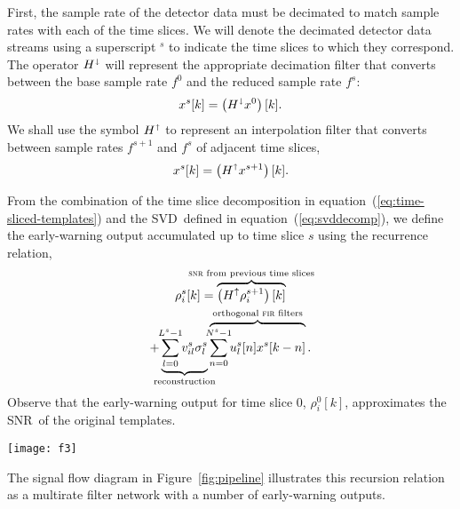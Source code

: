 \documentclass[preprint2]{aastex}
\newcommand{\SNR}{SNR}%
\newcommand{\SVD}{SVD}%
\newcommand{\fir}{FIR}%
\newcommand{\lloid}{LLOID}%
\def\clap#1{\hbox to 0pt{\hss#1\hss}}
\def\mathclap{\mathpalette\mathclapinternal}
\def\mathclapinternal#1#2{\clap{$\mathsurround=0pt#1{#2}$}}
\begin{document}
First, the sample rate of the detector data must be decimated to match sample
rates with each of the time slices.  We will denote the decimated detector data
streams using a superscript $^s$ to indicate the time slices to which they
correspond.  The operator $H^\shortdownarrow$ will represent the appropriate
decimation filter that converts between the base sample rate $f^0$ and the
reduced sample rate $f^s$:
\begin{equation*}
\label{eq:decomp}
	x^{s}[k] = \left( H^\shortdownarrow x^0\right)[k].
\end{equation*}
We shall use the symbol $H^\shortuparrow$ to represent an interpolation filter
that converts between sample rates $f^{s+1}$ and $f^s$ of adjacent time slices,
\begin{equation*}
	x^{s}[k] = \left( H^\shortuparrow x^{s+1}\right)[k].
\end{equation*}

From the combination of the time slice decomposition in
equation~(\ref{eq:time-sliced-templates}) and the \SVD\ defined in
equation~(\ref{eq:svddecomp}), we define the early-warning output accumulated
up to time slice $s$ using the recurrence relation,
%
%
\begin{multline}
	\rho_i^s [k] =%
		\overbrace{
			\left(H^\uparrow \rho_i^{s+1}\right)[k]
		}^\textrm{\clap{{\sc snr} from previous time slices}} \\
		+
		\underbrace{
			\sum_{\mathclap{l=0}}^{\mathclap{L^s-1}} v_{il}^s \sigma_l^s
		}_\textrm{\clap{reconstruction}}
		\overbrace{
			\sum_{\mathclap{n=0}}^{\mathclap{N^s-1}} u_l^s[n] x^s[k-n]
		}^\textrm{\clap{orthogonal {\sc fir} filters}} .
\end{multline}
%
%
Observe that the early-warning output for time slice 0, $\rho_i^0[k]$,
approximates the \SNR\ of the original templates.
%
%
\begin{figure*}[h!]
	\begin{center}
		\texttt{[image: f3]}
		\caption{\label{fig:pipeline} Schematic of \lloid\ pipeline illustrating
signal flow.  Circles with arrows represent interpolation
\protect\texttt{[image: f3a]} or decimation
\protect\texttt{[image: f3b]}.  Circles with plus
signs represent summing junctions
\protect\texttt{[image: f3c]}.  Squares
\protect\texttt{[image: f3d]} stand for \fir\ filters.  Sample
rate decreases from the top of the diagram to the bottom.  In this diagram each
time slice contains three \fir\ filters that are linearly combined to produce
four output channels.  In a typical pipeline the number of \fir\ filters is
much less than the number of output channels.}
	\end{center}
\end{figure*}
%
%
The signal flow diagram in Figure~\ref{fig:pipeline} illustrates this
recursion relation as a multirate filter network with a number of early-warning outputs.
\end{document}
